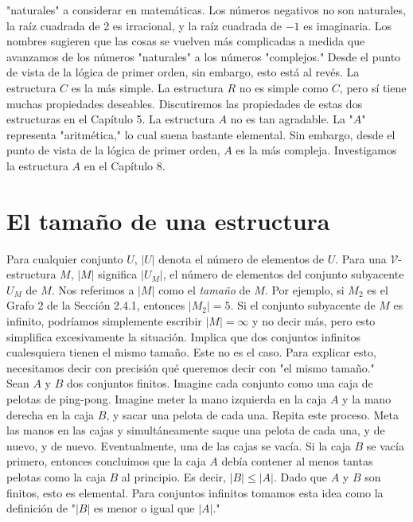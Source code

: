 \message{ !name(main.tex)}\documentclass[12pt,a4paper]{book}
\newcommand{\comillas}[1]{"#1"}
\newcommand{\VV}{\mathcal{V}}
\begin{document}
    \comillas{naturales} a considerar en matemáticas. Los números negativos no son naturales, la raíz cuadrada de 2 es
    irracional, y la raíz cuadrada de $-1$ es imaginaria. Los nombres sugieren que las cosas se vuelven más complicadas a
    medida que avanzamos de los números \comillas{naturales} a los números \comillas{complejos.} Desde el punto de vista de
    la lógica de primer orden, sin embargo, esto está al revés. La estructura $C$ es la más simple. La estructura $R$ no es
    simple como $C$, pero sí tiene muchas propiedades deseables. Discutiremos las propiedades de estas dos estructuras en
    el Capítulo 5. La estructura $A$ no es tan agradable. La \comillas{$A$} representa \comillas{aritmética,} lo cual suena
    bastante elemental. Sin embargo, desde el punto de vista de la lógica de primer orden, $A$ es la más compleja.
    Investigamos la estructura $A$ en el Capítulo 8.

    \section{El tamaño de una estructura}

    Para cualquier conjunto $U$, $|U|$ denota el número de elementos de $U$. Para una $\VV$-estructura $M$, $|M|$ significa
    $|U_{M}|$, el número de elementos del conjunto subyacente $U_{M}$ de $M$. Nos referimos a $|M|$ como el
    \textit{tamaño} de $M$. Por ejemplo, si $M_{2}$ es el Grafo 2 de la Sección 2.4.1, entonces $|M_{2}|=5$. Si el conjunto
    subyacente de $M$ es infinito, podríamos simplemente escribir $|M|=\infty$ y no decir más, pero esto simplifica
    excesivamente la situación. Implica que dos conjuntos infinitos cualesquiera tienen el mismo tamaño. Este no es el
    caso. Para explicar esto, necesitamos decir con precisión qué queremos decir con \comillas{el mismo tamaño.}\\
    Sean $A$ y $B$ dos conjuntos finitos. Imagine cada conjunto como una caja de pelotas de ping-pong. Imagine meter la
    mano izquierda en la caja $A$ y la mano derecha en la caja $B$, y sacar una pelota de cada una. Repita este proceso.
    Meta las manos en las cajas y simultáneamente saque una pelota de cada una, y de nuevo, y de nuevo. Eventualmente, una
    de las cajas se vacía. Si la caja $B$ se vacía primero, entonces concluimos que la caja $A$ debía contener al menos
    tantas pelotas como la caja $B$ al principio. Es decir, $|B|\leq|A|$. Dado que $A$ y $B$ son finitos, esto es
    elemental. Para conjuntos infinitos tomamos esta idea como la definición de \comillas{$|B|$ es menor o igual que $|A|$.}
\end{document}
